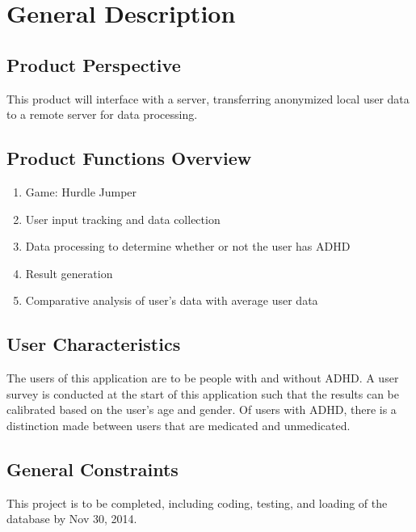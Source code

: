 \documentclass[a4wide]{article}
\begin{document}

\section{General Description}

\subsection{Product Perspective}

This product will interface with a server, transferring anonymized local user data to a remote server for data processing.


\subsection{Product Functions Overview}

\begin{enumerate}
\item Game: Hurdle Jumper
\item User input tracking and data collection
\item Data processing to determine whether or not the user has ADHD
\item Result generation
\item Comparative analysis of user's data with average user data
\end{enumerate} 

\subsection{User Characteristics}

The users of this application are to be people with and without ADHD. A user survey is conducted at the start of this application such that the results can be calibrated based on the user's age and gender. Of users with ADHD, there is a distinction made between users that are medicated and unmedicated. 

\subsection{General Constraints}

This project is to be completed, including coding, testing, and loading of the database by Nov 30, 2014. 

\end{document}
